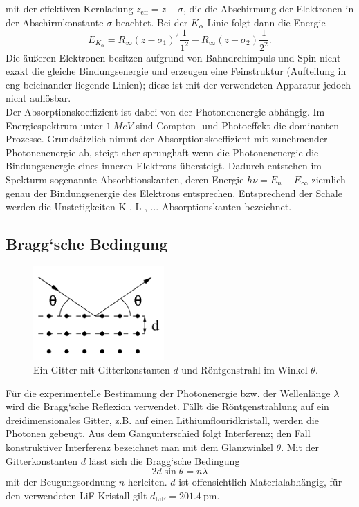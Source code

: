 mit der effektiven Kernladung $z_\text{eff} = z - \sigma$, die die Abschirmung der
Elektronen in der Abschirmkonstante $\sigma$ beachtet. Bei der $K_\alpha$-Linie folgt dann
die Energie
\begin{equation}
	\label{eqn:eal}
	E_{K_\alpha} = R_\infty (z - \sigma_1)^2 \frac{1}{1^2} - R_\infty (z - \sigma_2)
	\frac{1}{2^2}.
\end{equation}
Die äußeren Elektronen besitzen aufgrund von Bahndrehimpuls und Spin nicht exakt die
gleiche Bindungsenergie und erzeugen eine Feinstruktur (Aufteilung in eng beieinander
liegende Linien); diese ist mit der verwendeten Apparatur jedoch nicht auflösbar.
\\
Der Absorptionskoeffizient ist dabei von der Photonenenergie abhängig. Im Energiespektrum
unter $\SI{1}{MeV}$ sind Compton- und Photoeffekt die dominanten Prozesse. Grundsätzlich
nimmt der Absorptionskoeffizient mit zunehmender Photonenenergie ab, steigt aber
sprunghaft wenn die Photonenenergie die Bindungsenergie eines inneren Elektrons
übersteigt. Dadurch entstehen im Spekturm sogenannte Absorbtionskanten, deren Energie
$h\nu = E_n - E_\infty$ ziemlich genau der Bindungsenergie des Elektrons entsprechen.
Entsprechend der Schale werden die Unstetigkeiten K-, L-, $\hdots$ Absorptionskanten
bezeichnet.

\subsection{Bragg`sche Bedingung}
\label{sec:Bragg`sche Bedingung}
\begin{figure}
	\begin{center}
		\includegraphics[width=5cm]{images/gitter.png}
	\caption{Ein Gitter mit Gitterkonstanten $d$ und Röntgenstrahl im Winkel
	$\theta$. \cite{V602}}
	\end{center}
	\label{fig:gitter}
\end{figure}
Für die experimentelle Bestimmung der Photonenergie bzw. der Wellenlänge $\lambda$ wird
die Bragg`sche Reflexion verwendet. Fällt die Röntgenstrahlung auf ein
dreidimensionales Gitter, z.B. auf einen Lithiumflouridkristall, werden die Photonen
gebeugt. Aus dem Gangunterschied folgt Interferenz; den Fall konstruktiver Interferenz
bezeichnet man mit dem Glanzwinkel $\theta$. Mit der Gitterkonstanten $d$ lässt sich die
Bragg`sche Bedingung
\begin{equation}
	2d \sin\theta = n\lambda
	\label{eqn:braggsche-bedingung}
\end{equation}
mit der Beugungsordnung $n$ herleiten. $d$ ist offensichtlich Materialabhängig, für den
verwendeten LiF-Kristall gilt $d_\text{LiF} = \SI{201.4}{\pm}$.

